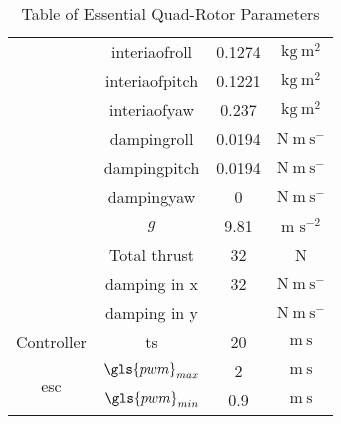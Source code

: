 \begin{table}[h]
\begin{tabular}{|c||c|c|c|}
			&\gls{interiaofroll}                     & 0.1274                     & $\mathrm{kg~m^{2}}$      \\ \cline{2-4} 
			& \gls{interiaofpitch}                & 0.1221                     & $\mathrm{kg~m^{2}}$      \\ \cline{2-4} 
			& \gls{interiaofyaw}                 & 0.237                      & $\mathrm{kg~m^{2}}$      \\ \cline{2-4} 
			& \gls{dampingroll}                  & 0.0194                     & $\mathrm{N~m~s^{-}}$     \\ \cline{2-4} 
			& \gls{dampingpitch}               & 0.0194                     & $\mathrm{N~m~s^{-}}$     \\ \cline{2-4} 
			& \gls{dampingyaw}                & 0                          & $\mathrm{N~m~s^{-}}$     \\ \cline{2-4} 
			& \ensuremath{g}                                     & 9.81                       & m $\mathrm{s^{-2}}$      \\ \cline{2-4} 
			& Total thrust                             & 32                         & N               \\   \cline{2-4} 
		   & damping in x                              & 32                         & $\mathrm{N~m~s^{-}}$              \\   \cline{2-4} 
			& damping in y                            &								&	$\mathrm{N~m~s^{-}}$ 				  \\  \hline
			Controller                                                 & \gls{ts}                             & 20                         & $\mathrm{m~s}$           \\ \hline
			\multirow{2}{*}{\gls{esc}}                                     &$ \gls{pwm}_{max}$                      & 2                          & $\mathrm{m~s}$           \\ \cline{2-4} 
			& $\gls{pwm}_{min}$                      & 0.9                        & $\mathrm{m~s}$           \\ \hline
		\end{tabular}
		\caption{Table of Essential Quad-Rotor Parameters}
	\end{table}
	
	